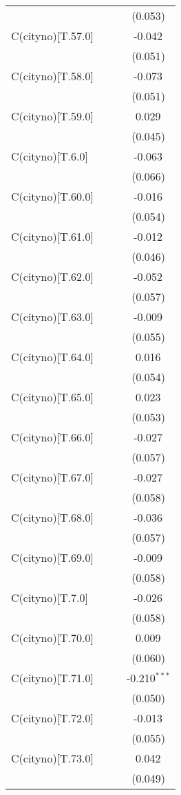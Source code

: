 \begin{table}[!htbp]
\begin{tabular}{@{\extracolsep{5pt}}lccc}
& & & (0.053) \\
 C(cityno)[T.57.0] & & & -0.042$^{}$ \\
& & & (0.051) \\
 C(cityno)[T.58.0] & & & -0.073$^{}$ \\
& & & (0.051) \\
 C(cityno)[T.59.0] & & & 0.029$^{}$ \\
& & & (0.045) \\
 C(cityno)[T.6.0] & & & -0.063$^{}$ \\
& & & (0.066) \\
 C(cityno)[T.60.0] & & & -0.016$^{}$ \\
& & & (0.054) \\
 C(cityno)[T.61.0] & & & -0.012$^{}$ \\
& & & (0.046) \\
 C(cityno)[T.62.0] & & & -0.052$^{}$ \\
& & & (0.057) \\
 C(cityno)[T.63.0] & & & -0.009$^{}$ \\
& & & (0.055) \\
 C(cityno)[T.64.0] & & & 0.016$^{}$ \\
& & & (0.054) \\
 C(cityno)[T.65.0] & & & 0.023$^{}$ \\
& & & (0.053) \\
 C(cityno)[T.66.0] & & & -0.027$^{}$ \\
& & & (0.057) \\
 C(cityno)[T.67.0] & & & -0.027$^{}$ \\
& & & (0.058) \\
 C(cityno)[T.68.0] & & & -0.036$^{}$ \\
& & & (0.057) \\
 C(cityno)[T.69.0] & & & -0.009$^{}$ \\
& & & (0.058) \\
 C(cityno)[T.7.0] & & & -0.026$^{}$ \\
& & & (0.058) \\
 C(cityno)[T.70.0] & & & 0.009$^{}$ \\
& & & (0.060) \\
 C(cityno)[T.71.0] & & & -0.210$^{***}$ \\
& & & (0.050) \\
 C(cityno)[T.72.0] & & & -0.013$^{}$ \\
& & & (0.055) \\
 C(cityno)[T.73.0] & & & 0.042$^{}$ \\
& & & (0.049) \\

\end{tabular}
\end{table}
